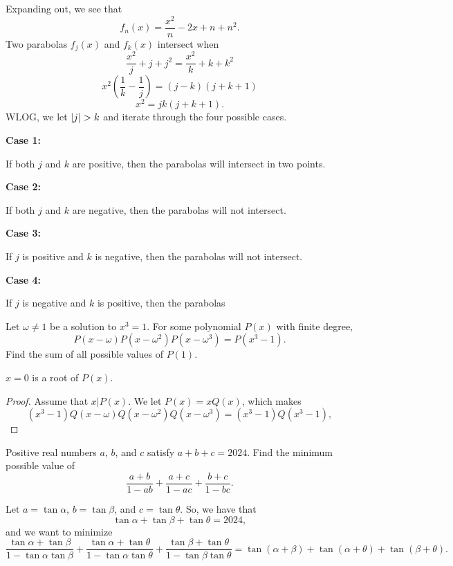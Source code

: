 \documentclass[11pt]{scrartcl}
\begin{document}
Expanding out, we see that
\[f_{n}(x) = \frac{x^{2}}{n} - 2x + n + n^{2}.\]
Two parabolas $f_{j}(x)$ and $f_{k}(x)$ intersect when
\[\frac{x^{2}}{j} + j + j^{2} = \frac{x^{2}}{k} + k + k^{2}\]
\[x^{2}\left(\frac{1}{k} - \frac{1}{j}\right) = (j - k)(j + k + 1)\]
\[x^{2} = jk(j + k + 1).\]
WLOG, we let $\left\lvert j \right\rvert > k$ and iterate through the four possible cases.

\textbf{Case 1:}

If both $j$ and $k$ are positive, then the parabolas will intersect in two points.

\textbf{Case 2:}

If both $j$ and $k$ are negative, then the parabolas will not intersect.

\textbf{Case 3:}

If $j$ is positive and $k$ is negative, then the parabolas will not intersect.

\textbf{Case 4:}

If $j$ is negative and $k$ is positive, then the parabolas

\begin{problem}
    Let $\omega \neq 1$ be a solution to $x^{3} = 1$. For some polynomial $P(x)$ with finite degree,
    \[P(x - \omega)P(x - \omega^{2})P(x - \omega^{3}) = P(x^{3} - 1).\]
    Find the sum of all possible values of $P(1)$.
\end{problem}

\begin{claim}
    $x = 0$ is a root of $P(x)$.
\end{claim}

\begin{proof}
    Assume that $x \vert P(x)$. We let $P(x) = xQ(x)$, which makes
    \[(x^{3} - 1)Q(x - \omega)Q(x - \omega^{2})Q(x - \omega^{3}) = (x^{3} - 1)Q(x^{3} - 1),\]
\end{proof}

\begin{problem}
    Positive real numbers $a$, $b$, and $c$ satisfy $a + b + c = 2024$. Find the minimum possible value of
    \[\frac{a + b}{1 - ab} + \frac{a + c}{1 - ac} + \frac{b + c}{1 - bc}.\]
\end{problem}

Let $a = \tan\alpha$, $b = \tan\beta$, and $c = \tan\theta$. So, we have that
\[\tan\alpha + \tan\beta + \tan\theta = 2024,\]
and we want to minimize
\[\frac{\tan\alpha + \tan\beta}{1 - \tan\alpha\tan\beta} + \frac{\tan\alpha + \tan\theta}{1 - \tan\alpha\tan\theta} + \frac{\tan\beta + \tan\theta}{1 - \tan\beta\tan\theta} = \tan(\alpha + \beta) + \tan(\alpha + \theta) + \tan(\beta + \theta).\]
\end{document}
